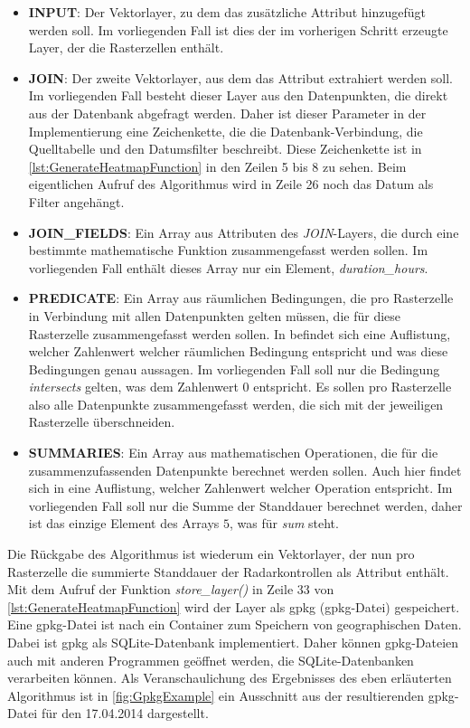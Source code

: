 \begin{itemize}
    \setlength\itemsep{-15pt}
    \item \textbf{INPUT}: Der Vektorlayer, zu dem das zusätzliche Attribut hinzugefügt werden soll. Im vorliegenden Fall ist dies der im vorherigen Schritt erzeugte Layer, der die Rasterzellen enthält.
    \item \textbf{JOIN}: Der zweite Vektorlayer, aus dem das Attribut extrahiert werden soll. Im vorliegenden Fall besteht dieser Layer aus den Datenpunkten, die direkt aus der Datenbank abgefragt werden. Daher ist dieser Parameter in der Implementierung eine Zeichenkette, die die Datenbank-Verbindung, die Quelltabelle und den Datumsfilter beschreibt. Diese Zeichenkette ist in \autoref{lst:GenerateHeatmapFunction} in den Zeilen 5 bis 8 zu sehen. Beim eigentlichen Aufruf des Algorithmus wird in Zeile 26 noch das Datum als Filter angehängt.
    \item \textbf{JOIN\_FIELDS}: Ein Array aus Attributen des \emph{JOIN}-Layers, die durch eine bestimmte mathematische Funktion zusammengefasst werden sollen. Im vorliegenden Fall enthält dieses Array nur ein Element, \emph{duration\_hours}.
    \item \textbf{PREDICATE}: Ein Array aus räumlichen Bedingungen, die pro Rasterzelle in Verbindung mit allen Datenpunkten gelten müssen, die für diese Rasterzelle zusammengefasst werden sollen. In \cite{QgisJoinByLocationSummary} befindet sich eine Auflistung, welcher Zahlenwert welcher räumlichen Bedingung entspricht und was diese Bedingungen genau aussagen. Im vorliegenden Fall soll nur die Bedingung \emph{intersects} gelten, was dem Zahlenwert $0$ entspricht. Es sollen pro Rasterzelle also alle Datenpunkte zusammengefasst werden, die sich mit der jeweiligen Rasterzelle überschneiden.
    \item \textbf{SUMMARIES}: Ein Array aus mathematischen Operationen, die für die zusammenzufassenden Datenpunkte berechnet werden sollen. Auch hier findet sich in \cite{QgisJoinByLocationSummary} eine Auflistung, welcher Zahlenwert welcher Operation entspricht. Im vorliegenden Fall soll nur die Summe der Standdauer berechnet werden, daher ist das einzige Element des Arrays $5$, was für \emph{sum} steht.
\end{itemize}

Die Rückgabe des Algorithmus ist wiederum ein Vektorlayer, der nun pro Rasterzelle die summierte Standdauer der Radarkontrollen als Attribut enthält.
Mit dem Aufruf der Funktion \emph{store\_layer()} in Zeile 33 von \autoref{lst:GenerateHeatmapFunction} wird der Layer als \acrlong{gpkg} (\acrshort{gpkg}-Datei) gespeichert.
Eine \acrshort{gpkg}-Datei ist nach \cite{GPKG} ein Container zum Speichern von geographischen Daten.
Dabei ist \acrshort{gpkg} als SQLite-Datenbank implementiert.
Daher können \acrshort{gpkg}-Dateien auch mit anderen Programmen geöffnet werden, die SQLite-Datenbanken verarbeiten können.
Als Veranschaulichung des Ergebnisses des eben erläuterten Algorithmus ist in \autoref{fig:GpkgExample} ein Ausschnitt aus der resultierenden \acrshort{gpkg}-Datei für den 17.04.2014 dargestellt.

